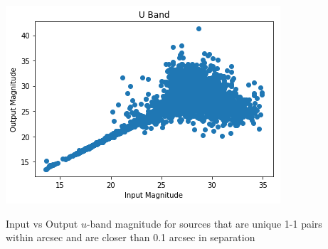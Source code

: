 \documentclass[aspectratio=169]{beamer}
\begin{document}
\begin{frame}
\begin{columns}
\begin{column}{7.5cm}
\begin{itemize}
      \end{itemize}
    \end{column}
    \begin{column}{5cm}
      \includegraphics[width=\linewidth]{./image.png}
      \begin{center}
\scriptsize
        Input vs Output $u$-band magnitude for sources that are unique
        1-1 pairs within arcsec and are closer than 0.1 arcsec in separation
        {\color{red}{AS: to be fixed}}
      \end{center}
    \end{column}
  \end{columns}



\end{frame}
\end{document}
